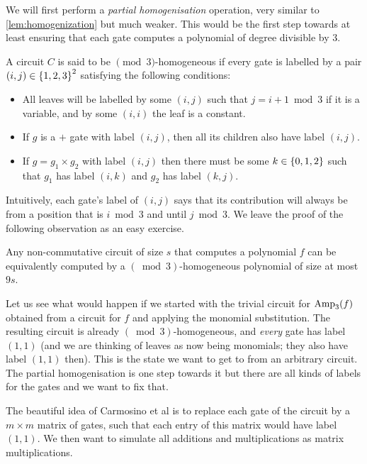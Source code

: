 We will first perform a \emph{partial homogenisation} operation, very similar to \autoref{lem:homogenization} but much weaker. This would be the first step towards at least ensuring that each gate computes a polynomial of degree divisible by $3$. 

\begin{definition} A circuit $C$ is said to be $\pmod{3}$-homogeneous if every gate is labelled by a pair $(i,j) \in \left\{1,2,3\right\}^2$ satisfying the following conditions: 
  \begin{itemize}
  \item All leaves will be labelled by some $(i,j)$ such that $j = i+1 \bmod 3$ if it is a variable, and by some $(i,i)$ the leaf is a constant.
  \item If $g$ is a $+$ gate with label $(i,j)$, then all its children also have label $(i,j)$.
  \item If $g = g_1 \times g_2$ with label $(i,j)$ then there must be some $k \in \left\{0,1,2\right\}$ such that $g_1$ has label $(i,k)$ and $g_2$ has label $(k,j)$. \qedhere
  \end{itemize}
\end{definition}

Intuitively, each gate's label of $(i,j)$ says that its contribution will always be from a position that is $i \bmod 3$ and until $j\bmod 3$. We leave the proof of the following observation as an easy exercise. 

\begin{observation}
  Any non-commutative circuit of size $s$ that computes a polynomial $f$ can be equivalently computed by a $(\bmod{3})$-homogeneous polynomial of size at most $9s$.  
\end{observation}

Let us see what would happen if we started with the trivial circuit for $\operatorname{Amp}_3(f)$ obtained from a circuit for $f$ and applying the monomial substitution. The resulting circuit is already $(\bmod{3})$-homogeneous, and \emph{every} gate has label $(1,1)$ (and we are thinking of leaves as now being monomials; they also have label $(1,1)$ then). This is the state we want to get to from an arbitrary circuit. The partial homogenisation is one step towards it but there are all kinds of labels for the gates and we want to fix that.

The beautiful idea of Carmosino et al \cite{CILM18} is to replace each gate of the circuit by a $m\times m$ matrix of gates, such that each entry of this matrix would have label $(1,1)$. We then want to simulate all additions and multiplications as matrix multiplications.




